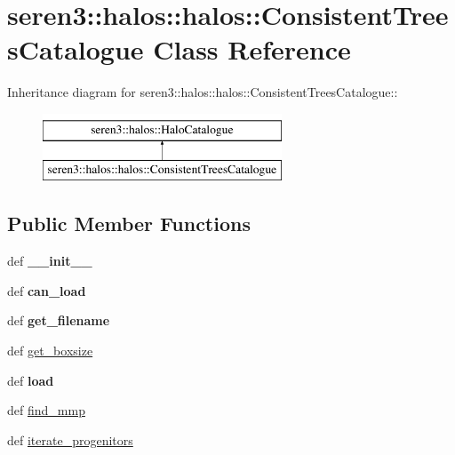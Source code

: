 \hypertarget{classseren3_1_1halos_1_1halos_1_1ConsistentTreesCatalogue}{
\section{seren3::halos::halos::ConsistentTreesCatalogue Class Reference}
\label{classseren3_1_1halos_1_1halos_1_1ConsistentTreesCatalogue}
}
Inheritance diagram for seren3::halos::halos::ConsistentTreesCatalogue::\begin{figure}[H]
\begin{center}
\leavevmode
\includegraphics[height=2cm]{classseren3_1_1halos_1_1halos_1_1ConsistentTreesCatalogue}
\end{center}
\end{figure}
\subsection*{Public Member Functions}
\begin{DoxyCompactItemize}
\item 
\hypertarget{classseren3_1_1halos_1_1halos_1_1ConsistentTreesCatalogue_ab1054a210b21579340a12e6e6672afc3}{
def {\bfseries \_\-\_\-init\_\-\_\-}}
\label{classseren3_1_1halos_1_1halos_1_1ConsistentTreesCatalogue_ab1054a210b21579340a12e6e6672afc3}

\item 
\hypertarget{classseren3_1_1halos_1_1halos_1_1ConsistentTreesCatalogue_a2dc5d0bfe8a5a7454efd6169ffadaaa9}{
def {\bfseries can\_\-load}}
\label{classseren3_1_1halos_1_1halos_1_1ConsistentTreesCatalogue_a2dc5d0bfe8a5a7454efd6169ffadaaa9}

\item 
\hypertarget{classseren3_1_1halos_1_1halos_1_1ConsistentTreesCatalogue_a057625c18b1bae3c4c9d502acbd5d12d}{
def {\bfseries get\_\-filename}}
\label{classseren3_1_1halos_1_1halos_1_1ConsistentTreesCatalogue_a057625c18b1bae3c4c9d502acbd5d12d}

\item 
def \hyperlink{classseren3_1_1halos_1_1halos_1_1ConsistentTreesCatalogue_a441bf99e14ee24b299b85045bd68878d}{get\_\-boxsize}
\item 
\hypertarget{classseren3_1_1halos_1_1halos_1_1ConsistentTreesCatalogue_aea71627044754a8b3fc35dcf5c1ae416}{
def {\bfseries load}}
\label{classseren3_1_1halos_1_1halos_1_1ConsistentTreesCatalogue_aea71627044754a8b3fc35dcf5c1ae416}

\item 
def \hyperlink{classseren3_1_1halos_1_1halos_1_1ConsistentTreesCatalogue_a7120b78f9a4469c4fee989733c1f0553}{find\_\-mmp}
\item 
def \hyperlink{classseren3_1_1halos_1_1halos_1_1ConsistentTreesCatalogue_a3c2a401a572e4df68cc2c744f5cca517}{iterate\_\-progenitors}
\end{DoxyCompactItemize}
